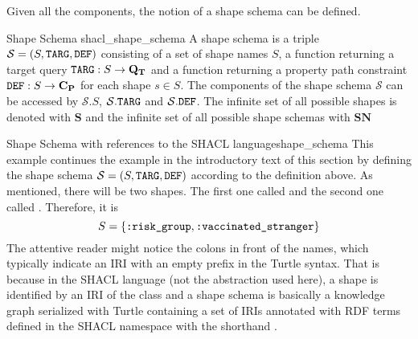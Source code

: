 Given all the components, the notion of a shape schema can be defined.
\begin{Def}{Shape Schema \cite{corman2018semantics}}{shacl_shape_schema}
A shape schema is a triple $\mathcal{S} = (S, \texttt{TARG}, \texttt{DEF})$ consisting of a set of shape names $S$, a function returning a target query $\texttt{TARG}: S \to \mathbf{Q_T}$ and a function returning a property path constraint $\texttt{DEF}: S \to \mathbf{C_P}$ for each shape $s \in S$.
The components of the shape schema $\mathcal{S}$ can be accessed by $\mathcal{S}.S$, $\mathcal{S}.\texttt{TARG}$ and $\mathcal{S}.\texttt{DEF}$.
The infinite set of all possible shapes is denoted with $\mathbf{S}$ and the infinite set of all possible shape schemas with $\mathbf{SN}$
\end{Def}

\begin{Bsp}{Shape Schema with references to the SHACL language}{shape_schema}
This example continues  the example in the introductory text of this section by defining the shape schema $\mathcal{S} = (S, \texttt{TARG}, \texttt{DEF})$ according to the definition above.
As mentioned, there will be two shapes. The first one called  and the second one called . Therefore, it is $$S = \{\texttt{:risk\_group}, \texttt{:vaccinated\_stranger}\}$$ The attentive reader might notice the colons in front of the names, which typically indicate an IRI with an empty prefix in the Turtle syntax. That is because in the SHACL language (not the abstraction used here), a shape is identified by an IRI of the class  and a shape schema is basically a knowledge graph serialized with Turtle containing a set of IRIs annotated with RDF terms defined in the SHACL namespace  with the shorthand  \cite{knublauch2017shapes}. 


\end{Bsp}
